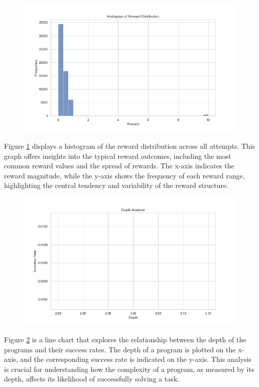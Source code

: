 \begin{figure}
    \centering
    \includegraphics[width=\textwidth]{../img/plot_reward_distribution.png}
    \caption{}
    \label{fig:reward_distribution}
\end{figure}
Figure \ref{fig:reward_distribution} displays a histogram of the reward distribution across all attempts. This graph offers insights into the typical reward outcomes, including the most common reward values and the spread of rewards. The x-axis indicates the reward magnitude, while the y-axis shows the frequency of each reward range, highlighting the central tendency and variability of the reward structure.

\begin{figure}
    \centering
    \includegraphics[width=\textwidth]{../img/plot_depth_analysis.png}
    \caption{}
    \label{fig:depth_analysis}
\end{figure}
Figure \ref{fig:depth_analysis} is a line chart that explores the relationship between the depth of the programs and their success rates. The depth of a program is plotted on the x-axis, and the corresponding success rate is indicated on the y-axis. This analysis is crucial for understanding how the complexity of a program, as measured by its depth, affects its likelihood of successfully solving a task.

